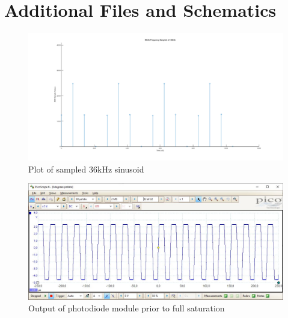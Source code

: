 \chapter{Additional Files and Schematics}
\label{ch_appendixa}






\begin{figure}[H]
	\centering
	\includegraphics[width=\linewidth]{figures/results/36khz_frequency.png}
	\caption{Plot of sampled 36kHz sinusoid}
	\label{fig:sampled_36khz_sinusoid}
\end{figure}

\begin{figure}[H]
	\centering
	\includegraphics[width=\linewidth]{figures/appendix/photodiode_0degrees.JPG}
	\caption{Output of photodiode module prior to full saturation}
	\label{fig:begin_saturation_of_photodiode}
\end{figure}

